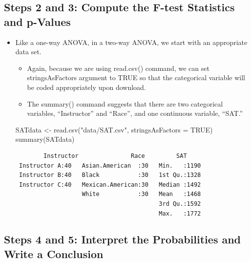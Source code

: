 \documentclass[
  letterpaper,
  DIV=11,
  numbers=noendperiod]{scrreprt}
\newenvironment{Shaded}{\begin{snugshade}}{\end{snugshade}}
\newcommand{\AttributeTok}[1]{\textcolor[rgb]{0.40,0.45,0.13}{#1}}
\newcommand{\ConstantTok}[1]{\textcolor[rgb]{0.56,0.35,0.01}{#1}}
\newcommand{\FunctionTok}[1]{\textcolor[rgb]{0.28,0.35,0.67}{#1}}
\newcommand{\NormalTok}[1]{\textcolor[rgb]{0.00,0.23,0.31}{#1}}
\newcommand{\OtherTok}[1]{\textcolor[rgb]{0.00,0.23,0.31}{#1}}
\newcommand{\StringTok}[1]{\textcolor[rgb]{0.13,0.47,0.30}{#1}}
\providecommand{\tightlist}{%
  \setlength{\itemsep}{0pt}\setlength{\parskip}{0pt}}\usepackage{longtable,booktabs,array}
\begin{document}
\subsection{Steps 2 and 3: Compute the F-test Statistics and
p-Values}\label{steps-2-and-3-compute-the-f-test-statistics-and-p-values}

\begin{itemize}
\item
  Like a one-way ANOVA, in a two-way ANOVA, we start with an appropriate
  data set.

  \begin{itemize}
  \tightlist
  \item
    Again, because we are using read.csv() command, we can set
    stringsAsFactors argument to TRUE so that the categorical variable
    will be coded appropriately upon download.
  \item
    The summary() command suggests that there are two categorical
    variables, ``Instructor'' and ``Race'', and one continuous variable,
    ``SAT.''
  \end{itemize}

\begin{Shaded}
\begin{Highlighting}[]
\NormalTok{SATdata }\OtherTok{\textless{}{-}} \FunctionTok{read.csv}\NormalTok{(}\StringTok{"data/SAT.csv"}\NormalTok{, }\AttributeTok{stringsAsFactors =} \ConstantTok{TRUE}\NormalTok{)}
\FunctionTok{summary}\NormalTok{(SATdata)}
\end{Highlighting}
\end{Shaded}

\begin{verbatim}
        Instructor               Race         SAT      
 Instructor A:40   Asian.American  :30   Min.   :1190  
 Instructor B:40   Black           :30   1st Qu.:1328  
 Instructor C:40   Mexican.American:30   Median :1492  
                   White           :30   Mean   :1468  
                                         3rd Qu.:1592  
                                         Max.   :1772  
\end{verbatim}
\end{itemize}

\subsection{Steps 4 and 5: Interpret the Probabilities and Write a
Conclusion}\label{steps-4-and-5-interpret-the-probabilities-and-write-a-conclusion}
\end{document}
